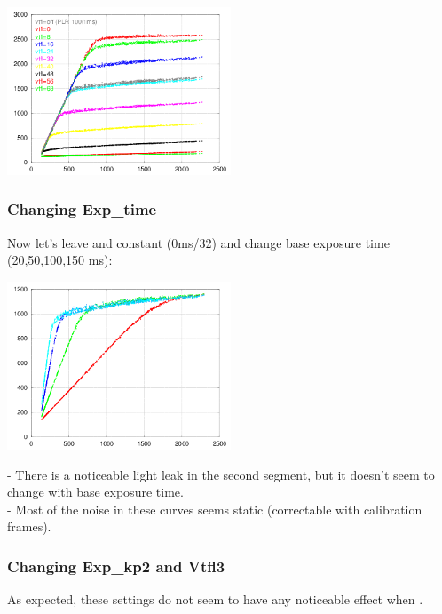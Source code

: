 \begin{center}
\includegraphics[height=5cm]{images/100-1-x-plr-vs-30ms-lin}
\end{center}

\subsubsection{Changing Exp\_time}

Now let's leave  and  constant (0ms/32) and change base exposure time (20,50,100,150 ms):\\

\begin{center}
\includegraphics[height=5cm]{images/x-0-32-plr-vs-30ms-lin}
\end{center}

- There is a noticeable light leak in the second segment, but it doesn't seem to change with base exposure time.\\
- Most of the noise in these curves seems static (correctable with calibration frames). \\

\subsubsection{Changing Exp\_kp2 and Vtfl3}

As expected, these settings do not seem to have any noticeable effect when . 



